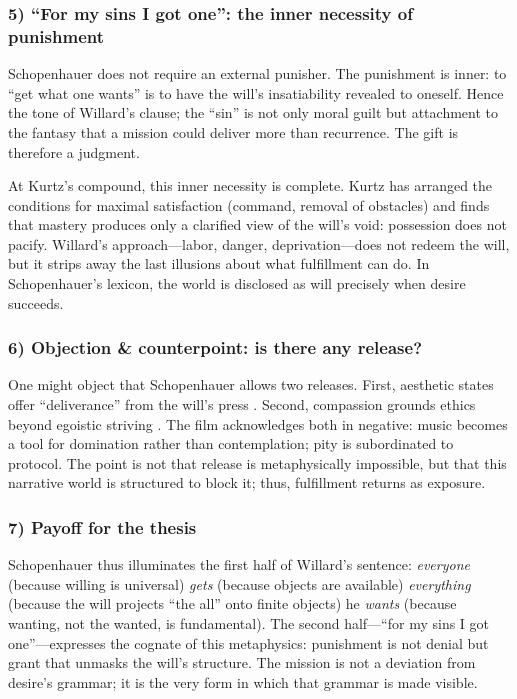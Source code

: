 \subsubsection*{5) ``For my sins I got one'': the inner necessity of punishment}

Schopenhauer does not require an external punisher. The punishment is inner: to ``get what one
wants'' is to have the will's insatiability revealed to oneself. Hence the tone of Willard's
clause; the ``sin'' is not only moral guilt but attachment to the fantasy that a mission could
deliver more than recurrence. The gift is therefore a judgment.

At Kurtz's compound, this inner necessity is complete. Kurtz has arranged the conditions for
maximal satisfaction (command, removal of obstacles) and finds that mastery produces only a
clarified view of the will's void: possession does not pacify. Willard's approach—labor, danger,
deprivation—does not redeem the will, but it strips away the last illusions about what
fulfillment can do. In Schopenhauer's lexicon, the world is disclosed as will precisely when
desire succeeds.

\subsubsection*{6) Objection \& counterpoint: is there any release?}

One might object that Schopenhauer allows two releases. First, aesthetic states offer
``deliverance'' from the will's press \parencite[p.~178]{SchopenhauerWWR1969}. Second,
compassion grounds ethics beyond egoistic striving \parencite[pp.~372--374]{SchopenhauerWWR1969}.
The film acknowledges both in negative: music becomes a tool for domination rather than
contemplation; pity is subordinated to protocol. The point is not that release is metaphysically
impossible, but that this narrative world is structured to block it; thus, fulfillment returns
as exposure.

\subsubsection*{7) Payoff for the thesis}

Schopenhauer thus illuminates the first half of Willard's sentence: \emph{everyone} (because
willing is universal) \emph{gets} (because objects are available) \emph{everything} (because
the will projects ``the all'' onto finite objects) he \emph{wants} (because wanting, not the
wanted, is fundamental). The second half—``for my sins I got one''—expresses the cognate of this
metaphysics: punishment is not denial but grant that unmasks the will's structure. The mission
is not a deviation from desire's grammar; it is the very form in which that grammar is made
visible.

